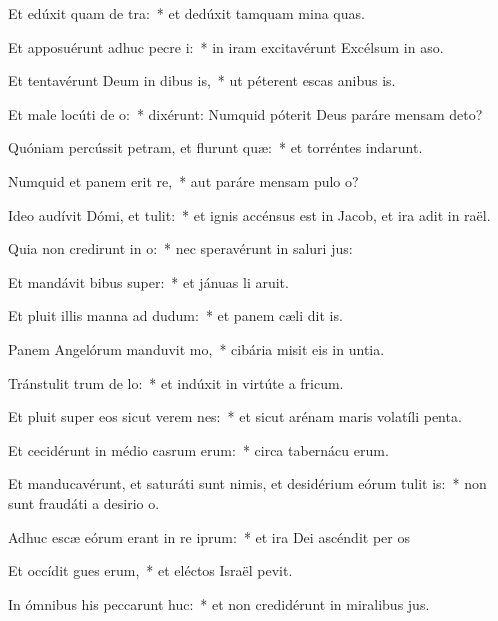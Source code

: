 \item Et edúxit quam de tra:~* et dedúxit tamquam mina quas.
\item Et apposuérunt adhuc pecre i:~* in iram excitavérunt Excélsum in aso.
\item Et tentavérunt Deum in dibus is,~* ut péterent escas anibus is.
\item Et male locúti  de o:~* dixérunt: Numquid póterit Deus paráre mensam  deto?
\item Quóniam percússit petram, et flurunt quæ:~* et torréntes indarunt.
\item Numquid et panem erit re,~* aut paráre mensam pulo o?
\item Ideo audívit Dómi, et tulit:~* et ignis accénsus est in Jacob, et ira adit in raël.
\item Quia non credirunt in o:~* nec speravérunt in saluri jus:
\item Et mandávit bibus super:~* et jánuas li aruit.
\item Et pluit illis manna ad dudum:~* et panem cæli dit is.
\item Panem Angelórum manduvit mo,~* cibária misit eis in untia.
\item Tránstulit trum de lo:~* et indúxit in virtúte a fricum.
\item Et pluit super eos sicut verem nes:~* et sicut arénam maris volatíli penta.
\item Et cecidérunt in médio casrum erum:~* circa tabernácu erum.
\item Et manducavérunt, et saturáti sunt nimis, et desidérium eórum tulit is:~* non sunt fraudáti a desirio o.
\item Adhuc escæ eórum erant in re iprum:~* et ira Dei ascéndit per os
\item Et occídit gues erum,~* et eléctos Israël pevit.
\item In ómnibus his peccarunt huc:~* et non credidérunt in miralibus jus.
